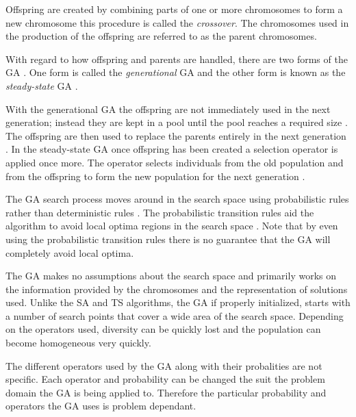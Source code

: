 Offspring are created by combining parts of one or more chromosomes to form a new chromosome this procedure is called the \emph{crossover}\cite{CompuIntelligenceIntro}. The chromosomes used in the production of the offspring are referred to as the parent chromosomes\cite{CompuIntelligenceIntro}.

With regard to how offspring and parents are handled, there are two forms of the \gls{GA} \cite{FamilyGA}. One form is called the \emph{generational} \gls{GA}  and the other form is known as the \emph{steady-state} \gls{GA} \cite{GeostatisticalGA,FamilyGA}.

With the generational \gls{GA} the offspring are not immediately used in the next generation; instead they are kept in a pool until the pool reaches a required size \cite{FamilyGA}. The offspring are then used to replace the parents entirely in the next generation \cite{FamilyGA}. In the steady-state \gls{GA} once offspring has been created a selection operator is applied once more. The operator selects individuals from the old population and from the offspring to form the new population for the next generation \cite{GeostatisticalGA,FamilyGA}.

The \gls{GA} search process moves around in the search space using probabilistic rules rather than deterministic rules \cite{FamilyGA}. The probabilistic transition rules aid the algorithm to avoid local optima regions in the search space \cite{HybridIntelliGA}. Note that by even using the probabilistic transition rules there is no guarantee that the \gls{GA} will completely avoid local optima\cite{CompuIntelligenceIntro}.

The \gls{GA} makes no assumptions about the search space and primarily works on the information provided by the chromosomes and the representation of solutions used\cite{CompuIntelligenceIntro,ConstrainedGA,HybridIntelliGA}. Unlike the \gls{SA} and \gls{TS} algorithms, the \gls{GA} if properly initialized, starts with a number of search points that cover a wide area of the search space. Depending on the operators used, diversity can be quickly lost and the population can become homogeneous very quickly\cite{DistributedHierarchicalGA,FamilyGA,HybridIntelliGA}\label{GASearchPoints}.
 
The different operators used by the GA along with their probalities are not specific. Each operator and probability can be changed the suit the problem domain the GA is being applied to. Therefore the particular probability and operators the GA uses is problem dependant.

